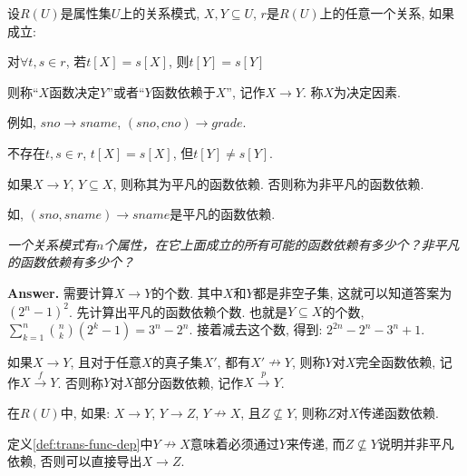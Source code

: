 \begin{definition}[函数依赖] \label{def:func-dep}
  设$R(U)$是属性集$U$上的关系模式, $X,Y\subseteq U$, $r$是$R(U)$上的任意一个关系, 如果成立:
  \begin{center}
    对$\forall t,s\in r$, 若$t[X]=s[X]$, 则$t[Y]=s[Y]$
  \end{center}
  则称``$X$函数决定$Y$''或者``$Y$函数依赖于$X$'', 记作$X\to Y$. 称$X$为决定因素.
\end{definition}

例如, $sno\to sname$, $(sno, cno)\to grade$.

\begin{definition}[函数依赖的双重否定形式的定义] \label{def:func-dep-2}
  不存在$t,s\in r$, $t[X]=s[X]$, 但$t[Y]\neq s[Y]$.
\end{definition}

\begin{definition}[平凡的函数依赖] \label{def:pingfan-func-dep}
  如果$X\to Y$, $Y\subseteq X$, 则称其为平凡的函数依赖. 否则称为非平凡的函数依赖.
\end{definition}

如, $(sno,sname)\to sname$是平凡的函数依赖.

\textit{一个关系模式有$n$个属性，在它上面成立的所有可能的函数依赖有多少个？非平凡的函数依赖有多少个？}

\textbf{Answer.} 需要计算$X\to Y$的个数. 其中$X$和$Y$都是非空子集, 这就可以知道答案为$(2^n-1)^2$.  先计算出平凡的函数依赖个数. 也就是$Y\subseteq X$的个数, $\sum_{k=1}^{n} \binom{n}{k} (2^k-1)=3^n-2^n$. 接着减去这个数, 得到: $2^{2n}-2^n-3^n+1$.


\begin{definition}[完全函数依赖] \label{def:tot-func-dep}
  如果$X\to Y$, 且对于任意$X$的真子集$X'$, 都有$X' \nrightarrow Y$, 则称$Y$对$X$完全函数依赖, 记作$X\overset{f}{\rightarrow} Y$. 否则称$Y$对$X$部分函数依赖, 记作$X\overset{p}{\rightarrow}Y$.
\end{definition}

\begin{definition}[传递函数依赖] \label{def:trans-func-dep}
  在$R(U)$中, 如果: $X\to Y$, $Y\to Z$, $Y\nrightarrow X$, 且$Z\nsubseteq Y$, 则称$Z$对$X$传递函数依赖.
\end{definition}

\begin{remark}
  定义\ref{def:trans-func-dep}中$Y\nrightarrow X$意味着必须通过$Y$来传递, 而$Z\nsubseteq Y$说明并非平凡依赖, 否则可以直接导出$X\to Z$.
\end{remark}

